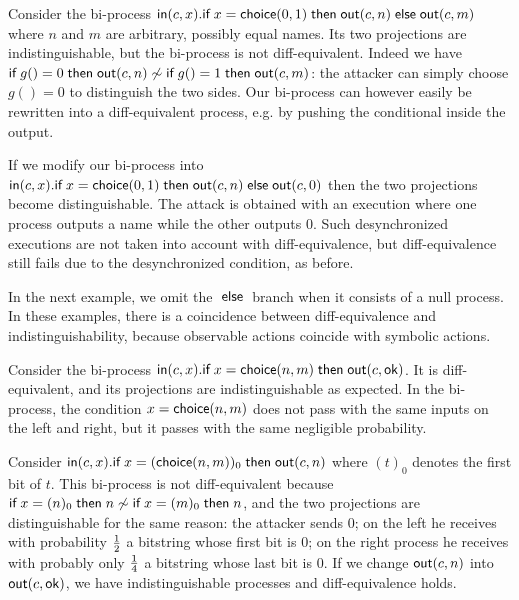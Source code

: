 \begin{example}
  Consider the bi-process
  $\mathsf{in}(c,x).\textsf{if}\; x=\mathsf{choice}(0,1) \;\textsf{then}\; \mathsf{out}(c,n) \;\textsf{else}\; \mathsf{out}(c,m)$
  where $n$ and $m$ are arbitrary, possibly equal names.
  Its two projections are indistinguishable, but the
  bi-process is not diff-equivalent.
  Indeed we have 
  $\textsf{if}\; g()=0 \;\textsf{then}\; \mathsf{out}(c,n) \not\sim
   \textsf{if}\; g()=1 \;\textsf{then}\; \mathsf{out}(c,m)$: the attacker can simply choose
  $g()=0$ to distinguish the two sides.
  Our bi-process can however easily be
  rewritten into a diff-equivalent process, e.g. by pushing the conditional
  inside the output.

  If we modify our bi-process into
  $\mathsf{in}(c,x).\textsf{if}\; x=\mathsf{choice}(0,1) \;\textsf{then}\; \mathsf{out}(c,n) \;\textsf{else}\; \mathsf{out}(c,0)$
  then the two projections become distinguishable.
  The attack is obtained with an execution
  where one process outputs a name while the other outputs $0$. Such
  desynchronized executions are not taken into account with diff-equivalence,
  but diff-equivalence still fails due to the desynchronized condition,
  as before.
\end{example}

\newcommand{\ok}{\mathsf{ok}}

In the next example, we omit the $\;\textsf{else}\;$ branch when it consists of a null 
process. In these examples, there is a coincidence between diff-equivalence
and indistinguishability, because observable actions coincide with symbolic 
actions.

\begin{example} \label{ex:negl}
  Consider the bi-process
  $\In(c,x).\myif x=\diff{n}{m} \mythen \Out(c,\ok)$.
  It is diff-equivalent, and its projections are
  indistinguishable as expected.
  In the bi-process, the condition $x=\mathsf{choice}(n,m)$ does not pass
  with the same inputs on the left and right, but it passes with
  the same negligible probability.
\end{example}

\begin{example} \label{ex:sync}
  Consider
  $\mathsf{in}(c,x).\textsf{if}\; x=(\mathsf{choice}(n,m))_0 \;\textsf{then}\; \mathsf{out}(c,n)$
  where $(t)_0$ denotes the first bit of $t$.
  This bi-process is not diff-equivalent because
  $\textsf{if}\; x=(n)_0 \;\textsf{then}\; n \not\sim \textsf{if}\; x=(m)_0 \;\textsf{then}\; n$, and
  the two projections are distinguishable for the same
  reason: the attacker sends $0$;
  on the left he receives with probability $1\over 2$ a bitstring whose
  first bit is $0$;
  on the right process he receives with probably only $1\over 4$
  a bitstring whose last bit is $0$.
  If we change $\mathsf{out}(c,n)$ into $\Out(c,\ok)$,
  we have indistinguishable processes and diff-equivalence holds.
\end{example}


